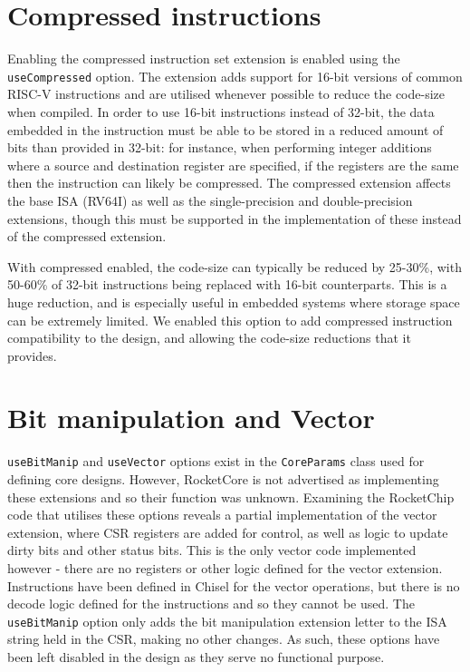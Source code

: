 \section{Compressed instructions}
Enabling the compressed instruction set extension is enabled using the \texttt{useCompressed} option. The extension adds support for 16-bit versions of common RISC-V instructions and are utilised whenever possible to reduce the code-size when compiled. In order to use 16-bit instructions instead of 32-bit, the data embedded in the instruction must be able to be stored in a reduced amount of bits than provided in 32-bit: for instance, when performing integer additions where a source and destination register are specified, if the registers are the same then the instruction can likely be compressed. The compressed extension affects the base ISA (RV64I) as well as the single-precision and double-precision extensions, though this must be supported in the implementation of these instead of the compressed extension.

With compressed enabled, the code-size can typically be reduced by 25-30\%, with 50-60\% of 32-bit instructions being replaced with 16-bit counterparts. This is a huge reduction, and is especially useful in embedded systems where storage space can be extremely limited. We enabled this option to add compressed instruction compatibility to the design, and allowing the code-size reductions that it provides.

\section{Bit manipulation and Vector}
\texttt{useBitManip} and \texttt{useVector} options exist in the \texttt{CoreParams} class used for defining core designs. However, RocketCore is not advertised as implementing these extensions and so their function was unknown. Examining the RocketChip code that utilises these options reveals a partial implementation of the vector extension, where CSR registers are added for control, as well as logic to update dirty bits and other status bits. This is the only vector code implemented however - there are no registers or other logic defined for the vector extension. Instructions have been defined in Chisel for the vector operations, but there is no decode logic defined for the instructions and so they cannot be used. The \texttt{useBitManip} option only adds the bit manipulation extension letter to the ISA string held in the CSR, making no other changes. As such, these options have been left disabled in the design as they serve no functional purpose.


